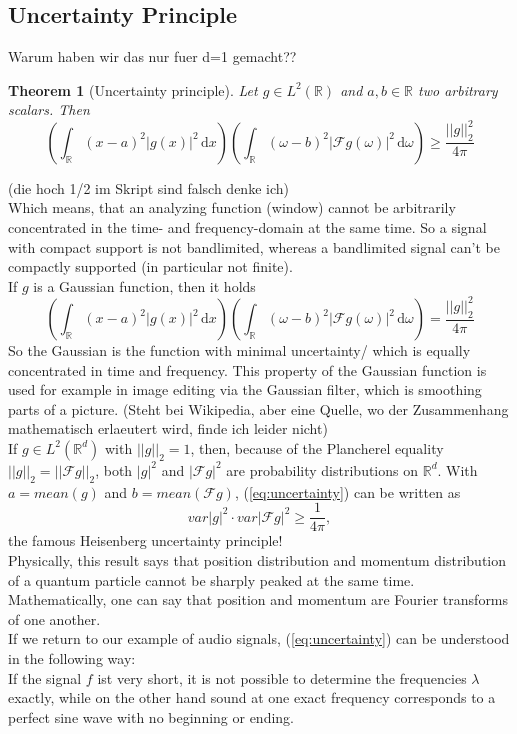 \documentclass[a4paper, 11pt]{scrreprt}
\newtheorem{theorem}[defi]{Theorem}
\newcommand{\RR}{\mathbb{R}}
\newcommand{\FF}{\mathcal{F}}
\begin{document}
\subsection{Uncertainty Principle}
\label{se:uncertainty}
Warum haben wir das nur fuer d=1 gemacht??
\begin{theorem}[Uncertainty principle]
Let \(g\in L^2(\RR) \) and \(a,b \in\RR\) two arbitrary scalars. Then
\begin{equation}
\label{eq:uncertainty}
\left(\int_{\RR} (x-a)^2|g(x)|^2 \,\mathrm{d}x\right)\left(\int_{\RR}(\omega-b)^2|\FF g(\omega)|^2\,\mathrm{d}\omega\right) \geq \frac{||g||_2^2}{4\pi}
\end{equation}
\end{theorem}
(die hoch 1/2 im Skript sind falsch denke ich)\\
Which means, that an analyzing function (window) cannot be arbitrarily concentrated in the time- and frequency-domain at the same time. So a signal with compact support is not bandlimited, whereas a bandlimited signal can't be compactly supported (in particular not finite).\\
If \(g\) is a Gaussian function, then it holds 
	\[\left(\int_{\RR} (x-a)^2|g(x)|^2 \,\mathrm{d}x\right)\left(\int_{\RR}(\omega-b)^2|\FF g(\omega)|^2\,\mathrm{d}\omega\right) = \frac{||g||_2^2}{4\pi}\]
So the Gaussian is the function with minimal uncertainty/  which is equally concentrated in time and frequency. This property of the Gaussian function is used for example in image editing via the Gaussian filter, which is smoothing parts of a picture. (Steht bei Wikipedia, aber eine Quelle, wo der Zusammenhang mathematisch erlaeutert wird, finde ich leider nicht)\\
If \(g\in L^2(\RR^d)\) with \(||g||_2=1\), then, because of the Plancherel equality \(||g||_2=||\FF g||_2\), both \(|g|^2\) and \(|\FF g|^2\) are probability distributions on \(\RR^d\). With \(a=mean(g)\) and \(b=mean(\FF g)\), (\ref{eq:uncertainty}) can be written as
	\[var|g|^2 \cdot var|\FF g|^2 \geq \frac{1}{4\pi},\]
the famous Heisenberg uncertainty principle!\\	
Physically, this result says that position distribution and momentum distribution of a quantum particle cannot be sharply peaked at the same time. Mathematically, one can say that position and momentum are Fourier transforms of one another.\\
If we return to our example of audio signals, (\ref{eq:uncertainty}) can be understood in the following way:\\
If the signal \(f\) ist very short, it is not possible to determine the frequencies \(\lambda\) exactly, while on the other hand sound at one exact frequency corresponds to a perfect sine wave with no beginning or ending.
\end{document}
